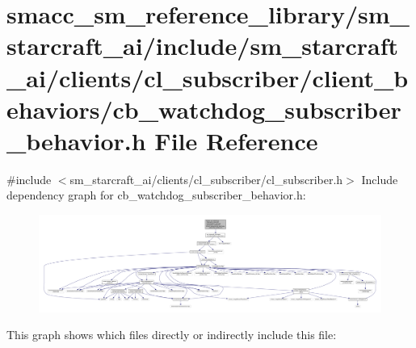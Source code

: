 \hypertarget{sm__starcraft__ai_2include_2sm__starcraft__ai_2clients_2cl__subscriber_2client__behaviors_2cb__wdfb3e50077225b2325e3a32b4e37e7e5}{}\section{smacc\+\_\+sm\+\_\+reference\+\_\+library/sm\+\_\+starcraft\+\_\+ai/include/sm\+\_\+starcraft\+\_\+ai/clients/cl\+\_\+subscriber/client\+\_\+behaviors/cb\+\_\+watchdog\+\_\+subscriber\+\_\+behavior.h File Reference}
\label{sm__starcraft__ai_2include_2sm__starcraft__ai_2clients_2cl__subscriber_2client__behaviors_2cb__wdfb3e50077225b2325e3a32b4e37e7e5}
{\ttfamily \#include $<$sm\+\_\+starcraft\+\_\+ai/clients/cl\+\_\+subscriber/cl\+\_\+subscriber.\+h$>$}\newline
Include dependency graph for cb\+\_\+watchdog\+\_\+subscriber\+\_\+behavior.\+h\+:
\nopagebreak
\begin{figure}[H]
\begin{center}
\leavevmode
\includegraphics[width=350pt]{sm__starcraft__ai_2include_2sm__starcraft__ai_2clients_2cl__subscriber_2client__behaviors_2cb__w45efd7d0ffb91dfad8633d34b059f4d2}
\end{center}
\end{figure}
This graph shows which files directly or indirectly include this file\+:
\nopagebreak
